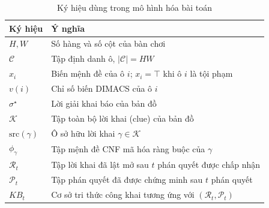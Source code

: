 \begin{table}[htbp]
  \centering
  \caption{Ký hiệu dùng trong mô hình hóa bài toán}
  \label{tab:ky_hieu}
  \begin{tabularx}{\textwidth}{l>{\raggedright\arraybackslash}X}
    \toprule
    \textbf{Ký hiệu} & \textbf{Ý nghĩa} \\
    \midrule
    $H, W$                 & Số hàng và số cột của bàn chơi \\
    $\mathcal{C}$          & Tập định danh ô, $|\mathcal{C}| = HW$ \\
    $x_i$                  & Biến mệnh đề của ô $i$; $x_i=\top$ khi ô $i$ là tội phạm \\
    $v(i)$                 & Chỉ số biến DIMACS của ô $i$ \\
    $\sigma^\star$         & Lời giải khai báo của bản đồ \\
    $\mathcal{K}$          & Tập toàn bộ lời khai (clue) của bản đồ \\
    $\mathrm{src}(\gamma)$ & Ô sở hữu lời khai $\gamma \in \mathcal{K}$ \\
    $\phi_\gamma$          & Tập mệnh đề CNF mã hóa ràng buộc của $\gamma$ \\
    $\mathcal{R}_t$        & Tập lời khai đã lật mở sau $t$ phán quyết được chấp nhận \\
    $\mathcal{P}_t$        & Tập phán quyết đã được chứng minh sau $t$ phán quyết \\
    $\mathit{KB}_t$        & Cơ sở tri thức công khai tương ứng với $(\mathcal{R}_t, \mathcal{P}_t)$ \\
    \bottomrule
  \end{tabularx}
\end{table}

